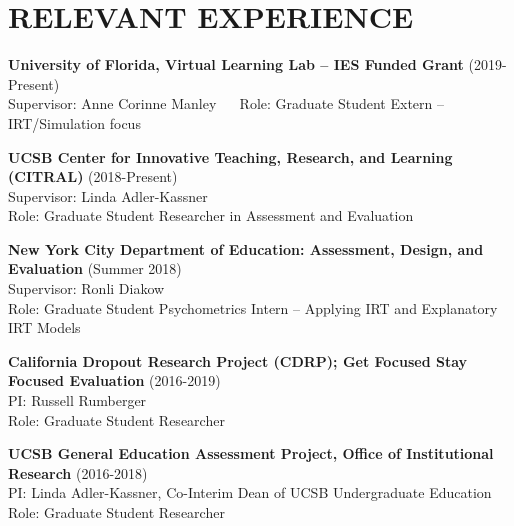 \documentclass[11pt, oneside]{memoir}
\begin{document}
\hypertarget{relevant-experience}{%
\section{RELEVANT EXPERIENCE}\label{relevant-experience}}

\textbf{University of Florida, Virtual Learning Lab -- IES Funded Grant}
(2019-Present)\\
\hspace*{0.333em}\hspace*{0.333em} Supervisor: Anne Corinne Manley ~~
Role: Graduate Student Extern -- IRT/Simulation focus

\textbf{UCSB Center for Innovative Teaching, Research, and Learning
(CITRAL)} (2018-Present)\\
\hspace*{0.333em}\hspace*{0.333em} Supervisor: Linda Adler-Kassner\\
\hspace*{0.333em}\hspace*{0.333em} Role: Graduate Student Researcher in
Assessment and Evaluation

\textbf{New York City Department of Education: Assessment, Design, and
Evaluation} (Summer 2018)\\
\hspace*{0.333em}\hspace*{0.333em} Supervisor: Ronli Diakow\\
\hspace*{0.333em}\hspace*{0.333em} Role: Graduate Student Psychometrics
Intern -- Applying IRT and Explanatory IRT Models

\textbf{California Dropout Research Project (CDRP); Get Focused Stay
Focused Evaluation} (2016-2019)\\
\hspace*{0.333em}\hspace*{0.333em} PI: Russell Rumberger\\
\hspace*{0.333em}\hspace*{0.333em} Role: Graduate Student Researcher

\textbf{UCSB General Education Assessment Project, Office of
Institutional Research} (2016-2018)\\
\hspace*{0.333em}\hspace*{0.333em} PI: Linda Adler-Kassner, Co-Interim
Dean of UCSB Undergraduate Education\\
\hspace*{0.333em}\hspace*{0.333em} Role: Graduate Student Researcher\\
\vspace{7mm}
\end{document}
